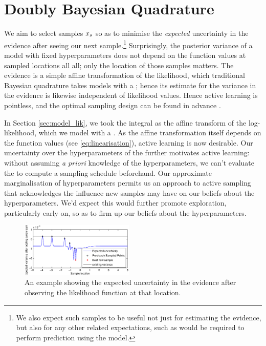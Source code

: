 \documentclass{article}
\begin{document}
\section{Doubly Bayesian Quadrature}

We aim to select samples $\lfv_s$ so as to minimise the \textit{expected} uncertainty in the evidence after seeing our next sample.\footnote{We also expect such samples to be useful not just for estimating the evidence, but also for any other related expectations, such as would be required to perform prediction using the model.}
Surprisingly, the posterior variance of a \gpb model with fixed hyperparameters does not depend on the function values at sampled locations all all; only the location of those samples matters. The evidence is a simple affine transformation of the likelihood, which traditional Bayesian quadrature takes models with a \gpb; hence its estimate for the variance in the evidence is likewise independent of likelihood values. Hence active learning is pointless, and the optimal sampling design can be found in advance \cite{minka2000dqr}.

In Section \ref{sec:model_lik}, we took the integral as the affine transform of the log-likelihood, which we model with a \gpb. As the affine transformation itself depends on the function values (see \eqref{eq:linearisation}), active learning is now desirable. Our uncertainty over the hyperparameters of the \gpb further motivates active learning: without assuming \textit{a priori} knowledge of the hyperparameters, we can't evaluate the \gpb to compute a sampling schedule beforehand. Our approximate marginalisation of hyperparameters permits us an approach to active sampling that acknowledges the influence new samples may have on our beliefs about the hyperparameters. We'd expect this would further promote exploration, particularly early on, so as to firm up our beliefs about the hyperparameters. 

 \begin{figure}
 \centering
 \includegraphics[width=0.48\textwidth]{figures/eue.eps}
 \caption{An example showing the expected uncertainty in the evidence after observing the likelihood function at that location.}
 \label{fig:eue}
 \end{figure}
 
\end{document}
